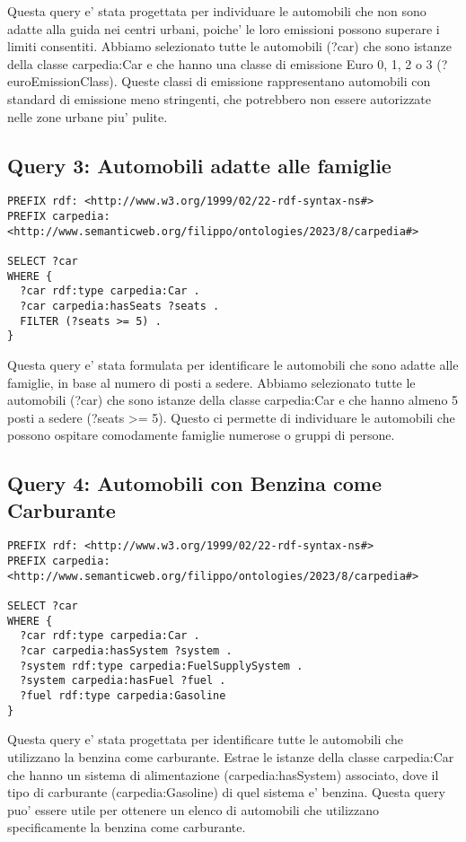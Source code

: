 Questa query e' stata progettata per individuare le automobili che non sono adatte alla guida nei centri urbani,
poiche' le loro emissioni possono superare i limiti consentiti.
Abbiamo selezionato tutte le automobili (?car) che sono istanze della classe carpedia:Car e che hanno una
classe di emissione Euro 0, 1, 2 o 3 (?euroEmissionClass).
Queste classi di emissione rappresentano automobili con standard di emissione meno stringenti,
che potrebbero non essere autorizzate nelle zone urbane piu' pulite.

\subsection{Query 3: Automobili adatte alle famiglie}

\begin{lstlisting}[language=SPARQL]
PREFIX rdf: <http://www.w3.org/1999/02/22-rdf-syntax-ns#>
PREFIX carpedia: <http://www.semanticweb.org/filippo/ontologies/2023/8/carpedia#>

SELECT ?car
WHERE {
  ?car rdf:type carpedia:Car .
  ?car carpedia:hasSeats ?seats .
  FILTER (?seats >= 5) .
}
\end{lstlisting}


Questa query e' stata formulata per identificare le automobili che sono adatte alle famiglie, in base al numero
di posti a sedere. Abbiamo selezionato tutte le automobili (?car) che sono istanze della classe carpedia:Car e
che hanno almeno 5 posti a sedere (?seats >= 5). Questo ci permette di individuare le automobili che possono
ospitare comodamente famiglie numerose o gruppi di persone.

\subsection{Query 4: Automobili con Benzina come Carburante}

\begin{lstlisting}[language=SPARQL]
PREFIX rdf: <http://www.w3.org/1999/02/22-rdf-syntax-ns#>
PREFIX carpedia: <http://www.semanticweb.org/filippo/ontologies/2023/8/carpedia#>

SELECT ?car
WHERE {
  ?car rdf:type carpedia:Car .
  ?car carpedia:hasSystem ?system .
  ?system rdf:type carpedia:FuelSupplySystem .
  ?system carpedia:hasFuel ?fuel .
  ?fuel rdf:type carpedia:Gasoline
}
\end{lstlisting}


Questa query e' stata progettata per identificare tutte le automobili che utilizzano la benzina come carburante.
Estrae le istanze della classe carpedia:Car che hanno un sistema di alimentazione (carpedia:hasSystem) associato,
dove il tipo di carburante (carpedia:Gasoline) di quel sistema e' benzina.
Questa query puo' essere utile per ottenere un elenco di automobili che utilizzano specificamente la benzina
come carburante.

